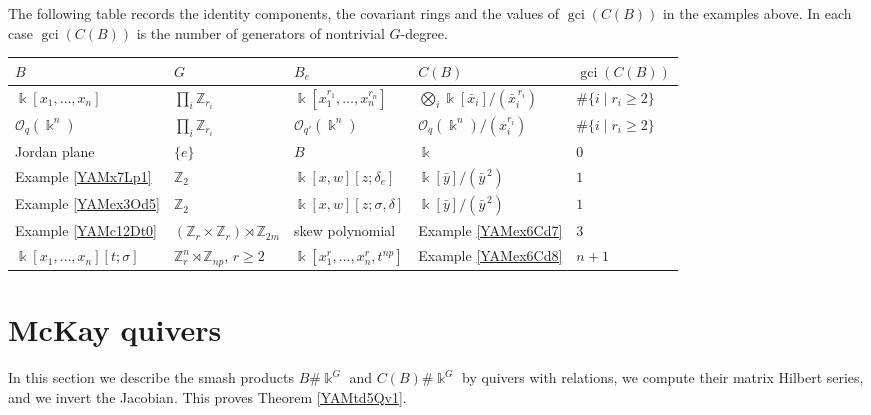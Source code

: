 \documentclass[reqno]{amsart}
\numberwithin{equation}{section}
\theoremstyle{definition}
\theoremstyle{remark}
\theoremstyle{plain}
\newcommand{\kk}{\Bbbk}
\DeclareMathOperator{\gci}{gci}
\begin{document}
The following table records the identity components, the covariant rings and the values of $\gci(C(B))$ in the examples above. In each case $\gci(C(B))$ is the number of generators of nontrivial $G$-degree.
\begin{center}
\small
\renewcommand{\arraystretch}{1.3}
\begin{tabular}{lllll}
$B$ & $G$ & $B_e$ & $C(B)$ & $\gci(C(B))$\\\hline
$\kk[x_1,\dots,x_n]$ & $\prod_i\mathbb Z_{r_i}$ & $\kk[x_1^{r_1},\dots,x_n^{r_n}]$ & $\bigotimes_i\kk[\bar x_i]/(\bar x_i^{\,r_i})$ & $\#\{i\mid r_i\ge2\}$\\
$\mathcal O_q(\kk^n)$ & $\prod_i\mathbb Z_{r_i}$ & $\mathcal O_{q'}(\kk^n)$ & $\mathcal O_q(\kk^n)/(x_i^{r_i})$ & $\#\{i\mid r_i\ge2\}$\\
Jordan plane & $\{e\}$ & $B$ & $\kk$ & $0$\\
Example \ref{YAMx7Lp1} & $\mathbb Z_2$ & $\kk[x,w][z;\delta_e]$ & $\kk[\bar y]/(\bar y^{\,2})$ & $1$\\
Example \ref{YAMex3Od5} & $\mathbb Z_2$ & $\kk[x,w][z;\sigma,\delta]$ & $\kk[\bar y]/(\bar y^{\,2})$ & $1$\\
Example \ref{YAMc12Dt0} & $(\mathbb Z_r\times\mathbb Z_r)\rtimes\mathbb Z_{2m}$ & skew polynomial & Example \ref{YAMex6Cd7} & $3$\\
$\kk[x_1,\dots,x_n][t;\sigma]$ & $\mathbb Z_r^n\rtimes\mathbb Z_{np}$, $r\ge2$ & $\kk[x_1^r,\dots,x_n^r,t^{np}]$ & Example \ref{YAMex6Cd8} & $n+1$
\end{tabular}
\end{center}


\section{McKay quivers}\label{YAMs8Mq0}

In this section we describe the smash products $B\#\kk^G$ and $C(B)\#\kk^G$ by quivers with relations, we compute their matrix Hilbert series, and we invert the Jacobian. This proves Theorem \ref{YAMtd5Qv1}.
\end{document}
